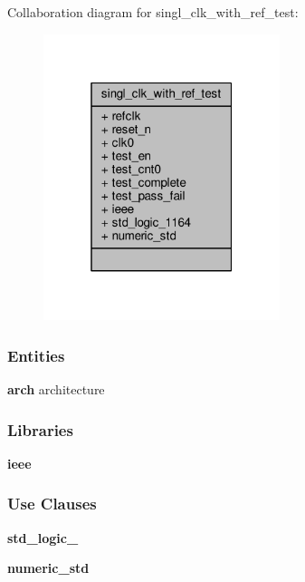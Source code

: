 Collaboration diagram for singl\+\_\+clk\+\_\+with\+\_\+ref\+\_\+test\+:\nopagebreak
\begin{figure}[H]
\begin{center}
\leavevmode
\includegraphics[width=196pt]{da/d36/classsingl__clk__with__ref__test__coll__graph}
\end{center}
\end{figure}
\subsubsection*{Entities}
\begin{DoxyCompactItemize}
\item 
{\bf arch} architecture
\end{DoxyCompactItemize}
\subsubsection*{Libraries}
 \begin{DoxyCompactItemize}
\item 
{\bf ieee} 
\end{DoxyCompactItemize}
\subsubsection*{Use Clauses}
 \begin{DoxyCompactItemize}
\item 
{\bf std\+\_\+logic\+\_}   
\item 
{\bf numeric\+\_\+std}   
\end{DoxyCompactItemize}
